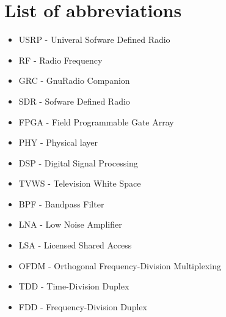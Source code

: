 \section*{List of abbreviations}



\begin{itemize}
\tightlist
\item
  USRP - Univeral Sofware Defined Radio
\item
  RF - Radio Frequency
\item
  GRC - GnuRadio Companion
\item
  SDR - Sofware Defined Radio
\item
  FPGA - Field Programmable Gate Array
\item
  PHY - Physical layer
\item
  DSP - Digital Signal Processing
\item
  TVWS - Television White Space
\item
  BPF - Bandpass Filter
\item
  LNA - Low Noise Amplifier
\item
  LSA - Licensed Shared Access
\item
  OFDM - Orthogonal Frequency-Division Multiplexing
\item
  TDD - Time-Division Duplex
\item
  FDD - Frequency-Division Duplex
\end{itemize}
